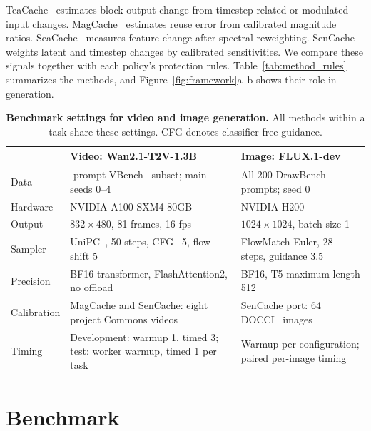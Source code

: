 \documentclass[10pt,twocolumn,letterpaper]{article}
\begin{document}
TeaCache~\cite{liu2025teacache} estimates block-output change from timestep-related or modulated-input changes.
MagCache~\cite{ma2025magcache} estimates reuse error from calibrated magnitude ratios.
SeaCache~\cite{chung2026seacache} measures feature change after spectral reweighting.
SenCache~\cite{haghighi2026sencache} weights latent and timestep changes by calibrated sensitivities.
We compare these signals together with each policy's protection rules.
Table~\ref{tab:method_rules} summarizes the methods, and Figure~\ref{fig:framework}a--b shows their role in generation.



\begin{table}[t]
\caption{\textbf{Benchmark settings for video and image generation.} All methods within a task share these settings. CFG denotes classifier-free guidance.}
\label{tab:protocol}
\centering\normalsize\setlength{\tabcolsep}{6pt}
\begin{tabularx}{\linewidth}{l>{\raggedright\arraybackslash}X>{\raggedright\arraybackslash}X}
\toprule
\rowcolor{tabhead} & \textbf{Video:} \mbox{Wan2.1-T2V-1.3B}~\cite{wan2025wan} & \textbf{Image:} \mbox{FLUX.1-dev}~\cite{flux2024}\\
\midrule
Data & 110-prompt VBench~\cite{huang2024vbench} subset; main seeds 0--4 & All 200 DrawBench~\cite{saharia2022imagen} prompts; seed 0\\
Hardware & NVIDIA A100-SXM4-80GB & NVIDIA H200\\
Output & $832\times480$, 81 frames, 16 fps & $1024\times1024$, batch size 1\\
Sampler & UniPC~\cite{zhao2023unipc}, 50 steps, CFG~\cite{ho2022cfg} 5, flow shift 5 & \mbox{FlowMatch-Euler}, 28 steps, guidance 3.5\\
Precision & BF16 transformer, FlashAttention2, no offload & BF16, T5 maximum length 512\\
Calibration & MagCache and SenCache: eight project Commons videos & SenCache port: 64 DOCCI~\cite{onoe2024docci} images\\
Timing & Development: warmup 1, timed 3; test: worker warmup, timed 1 per task & Warmup per configuration; paired per-image timing\\
\bottomrule
\end{tabularx}
\end{table}

\section{Benchmark}
\label{sec:benchmark}
\label{sec:methods}
\end{document}
